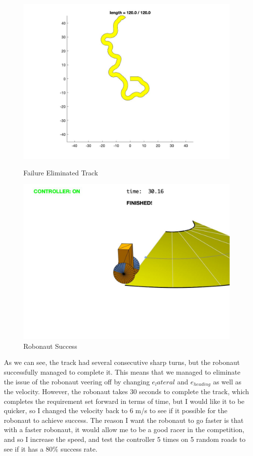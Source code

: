 \documentclass{article}
\begin{document}
 \begin{figure}[H]
\centering
\begin{minipage}{.5\textwidth}
	\centering
	\includegraphics[width=.8\linewidth]{failure eliminated track.jpg}
	\caption{Failure Eliminated Track}
	\end{minipage}%
\begin{minipage}{.5\textwidth}
	\centering
	\includegraphics[width=.8\linewidth]{Failure eliminated.jpg}
	\caption{Robonaut Success}
\end{minipage}
\end{figure}
As we can see, the track had several consecutive sharp turns, but the robonaut successfully managed to complete it. This means that we managed to eliminate the issue of the robonaut veering off by changing $e_lateral$ and $e_{heading}$ as well as the velocity. However, the robonaut takes 30 seconds to complete the track, which completes the requirement set forward in terms of time, but I would like it to be quicker, so I changed the velocity back to 6 m/s to see if it possible for the robonaut to achieve success. The reason I want the robonaut to go faster is that with a faster robonaut, it would allow me to be a good racer in the competition, and so I increase the speed, and test the controller 5 times on 5 random roads to see if it has a 80$\%$ success rate.\\
\end{document}
